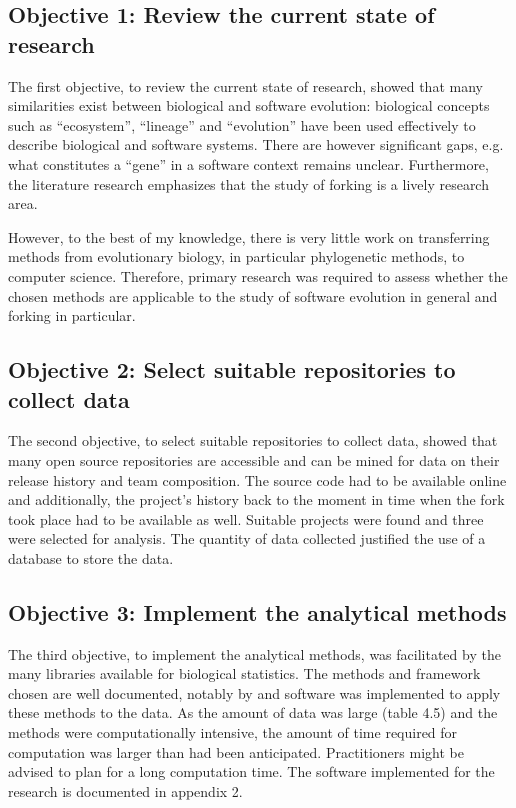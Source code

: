 \subsection{Objective 1: Review the current state of research}
The first objective, to review the current state of research, showed that many similarities exist between biological and software evolution: biological concepts such as “ecosystem”, “lineage” and “evolution” have been used effectively to describe biological and software systems. There are however significant gaps, e.g. what constitutes a “gene” in a software context remains unclear. Furthermore, the literature research emphasizes that the study of forking is a lively research area.

However, to the best of my knowledge, there is very little work on transferring methods from evolutionary biology, in particular phylogenetic methods, to computer science. Therefore, primary research was required to assess whether the chosen methods are applicable to the study of software evolution in general and forking in particular.

\subsection{Objective 2:  Select suitable repositories to collect data}
The second objective, to select suitable repositories to collect data, showed that many open source repositories are accessible and can be mined for data on their release history and team composition. The source code had to be available online and additionally, the project's history back to the moment in time when the fork took place had to be available as well. Suitable projects were found and three were selected for analysis. The quantity of data collected justified the use of a database to store the data.

\subsection{Objective 3: Implement the analytical methods}
The third objective, to implement the analytical methods, was facilitated by the many libraries available for biological statistics. The methods and framework chosen are well documented, notably by \citet{Paradis2011} and software was implemented to apply these methods to the data. As the amount of data was large (table 4.5) and the methods were computationally intensive, the amount of time required for computation was larger than had been anticipated. Practitioners might be advised to plan for a long computation time. The software implemented for the research is documented in appendix 2.

